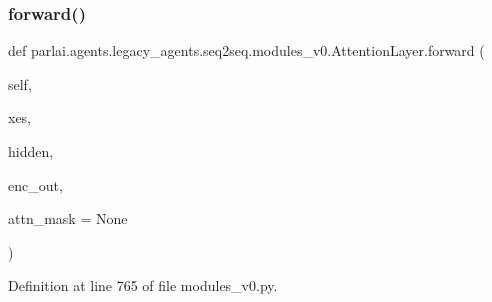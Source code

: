 \subsubsection{\texorpdfstring{forward()}{forward()}}
{\footnotesize\ttfamily def parlai.\+agents.\+legacy\+\_\+agents.\+seq2seq.\+modules\+\_\+v0.\+Attention\+Layer.\+forward (\begin{DoxyParamCaption}\item[{}]{self,  }\item[{}]{xes,  }\item[{}]{hidden,  }\item[{}]{enc\+\_\+out,  }\item[{}]{attn\+\_\+mask = {\ttfamily None} }\end{DoxyParamCaption})}



Definition at line 765 of file modules\+\_\+v0.\+py.



